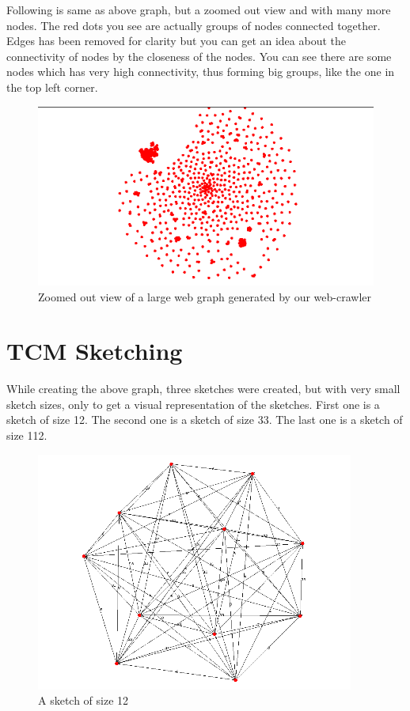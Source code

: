 \documentclass[12pt]{report}
\numberwithin{figure}{section}
\numberwithin{table}{section}
\begin{document}
Following is same as above graph, but a zoomed out view and with many more nodes. The red dots you see are actually groups of nodes connected together. Edges has been removed for clarity but you can get an idea about the connectivity of nodes by the closeness of the nodes. You can see there are some nodes which has very high connectivity, thus forming big groups, like the one in the top left corner. 

\begin{figure}[H]
\centering
\includegraphics[scale=0.8]{images/graph2}
\caption[Zoomed out view of a large web graph]{Zoomed out view of a large web graph generated by our web-crawler}
\end{figure}

\section{TCM Sketching}
While creating the above graph, three sketches were created, but with very small sketch sizes, only to get a visual representation of the sketches. First one is a sketch of size 12. The second one is a sketch of size 33. The last one is a sketch of size 112.


\begin{figure}[H]
\centering
\includegraphics[scale=0.8]{images/s1}
\caption{A sketch of size 12}
\end{figure}
\end{document}
